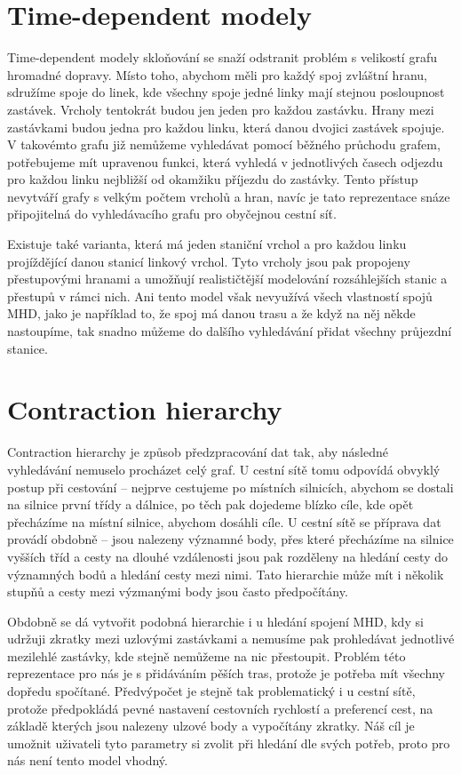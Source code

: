 \section{Time-dependent modely}
Time-dependent modely \cite{time-dependent}\TODO skloňování se snaží odstranit problém s
velikostí grafu hromadné dopravy. Místo toho, abychom měli pro každý spoj
zvláštní hranu, sdružíme spoje do linek, kde všechny spoje jedné linky mají
stejnou posloupnost zastávek. Vrcholy tentokrát budou jen jeden pro každou
zastávku. Hrany mezi zastávkami budou jedna pro každou linku, která danou
dvojici zastávek spojuje. V takovémto grafu již nemůžeme vyhledávat pomocí
běžného průchodu grafem, potřebujeme mít upravenou funkci, která vyhledá v
jednotlivých časech odjezdu pro každou linku nejbližší od okamžiku příjezdu do
zastávky. Tento přístup nevytváří grafy s velkým počtem vrcholů a hran, navíc je
tato reprezentace snáze připojitelná do vyhledávacího grafu pro obyčejnou cestní
síť.

Existuje také varianta, která má jeden staniční vrchol a
pro každou linku projíždějící danou stanicí linkový vrchol. Tyto vrcholy jsou
pak propojeny přestupovými hranami a umožňují realističtější modelování
rozsáhlejších stanic a přestupů v rámci nich. Ani tento model však nevyužívá
všech vlastností spojů MHD, jako je například to, že spoj má danou trasu a že
když na něj někde nastoupíme, tak snadno můžeme do dalšího vyhledávání přidat všechny
průjezdní stanice.  

\section{Contraction hierarchy}
Contraction hierarchy \cite{CH} je způsob předzpracování dat tak, aby následné
vyhledávání nemuselo procházet celý graf. U cestní sítě tomu odpovídá obvyklý
postup při cestování -- nejprve cestujeme po místních silnicích, abychom se
dostali na silnice první třídy a dálnice, po těch pak dojedeme blízko cíle, kde
opět přecházíme na místní silnice, abychom dosáhli cíle. U cestní sítě se
příprava dat provádí obdobně -- jsou nalezeny významné body, přes které
přecházíme na silnice vyšších tříd a cesty na dlouhé vzdálenosti jsou pak
rozděleny na hledání cesty do významných bodů a hledání cesty mezi nimi. Tato
hierarchie může mít i několik stupňů a cesty mezi výzmanými body jsou často
předpočítány.

Obdobně se dá vytvořit podobná hierarchie i u hledání spojení MHD, kdy si
udržuji zkratky mezi uzlovými zastávkami a nemusíme pak prohledávat jednotlivé
mezilehlé zastávky, kde stejně nemůžeme na nic přestoupit. Problém této
reprezentace pro nás je s přidáváním pěších tras, protože je potřeba mít všechny dopředu
spočítané. Předvýpočet je stejně tak problematický i u cestní sítě, protože
předpokládá pevné nastavení cestovních rychlostí a preferencí cest, na základě
kterých jsou nalezeny ulzové body a vypočítány zkratky. Náš cíl je umožnit
uživateli tyto parametry si zvolit při hledání dle svých potřeb, proto pro nás
není tento model vhodný. 


